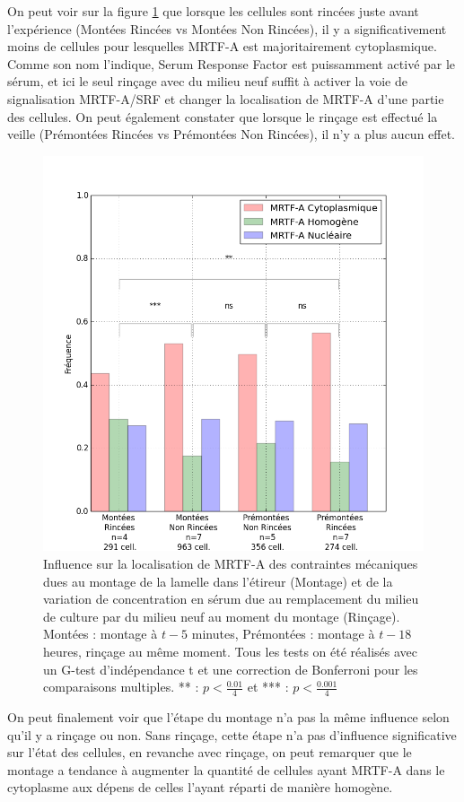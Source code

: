 On peut voir sur la figure \ref{CHN_montage} que lorsque les cellules sont rincées juste avant l'expérience (Montées Rincées vs Montées Non Rincées), il y a significativement moins de cellules pour lesquelles MRTF-A est majoritairement cytoplasmique. 
Comme son nom l'indique, Serum Response Factor est puissamment activé par le sérum, et ici le seul rinçage avec du milieu neuf suffit à activer la voie de signalisation MRTF-A/SRF et changer la localisation de MRTF-A d'une partie des cellules. 
On peut également constater que lorsque le rinçage est effectué la veille (Prémontées Rincées vs Prémontées Non Rincées), il n'y a plus aucun effet. 
\begin{figure}[h!]
\includegraphics[scale=0.5]{Figures/CHN_montage_rincage.png} 
\caption{\label{CHN_montage} Influence sur la localisation de MRTF-A des contraintes mécaniques dues au montage de la lamelle dans l'étireur (Montage) et de la variation de concentration en sérum due au remplacement du milieu de culture par du milieu neuf au moment du montage (Rinçage). Montées : montage à $t-5$ minutes, Prémontées : montage à $t-18$ heures, rinçage au même moment.
Tous les tests on été réalisés avec un G-test d'indépendance t et une correction de Bonferroni pour les comparaisons multiples. ** : $p<\frac{0.01}{4}$ et *** : $p<\frac{0.001}{4}$}
\end{figure}
On peut finalement voir que l'étape du montage n'a pas la même influence selon qu'il y a rinçage ou non. Sans rinçage, cette étape n'a pas d'influence significative sur l'état des cellules, en revanche avec rinçage, on peut remarquer que le montage a tendance à augmenter la quantité de cellules ayant MRTF-A dans le cytoplasme aux dépens de celles l'ayant réparti de manière homogène. 

